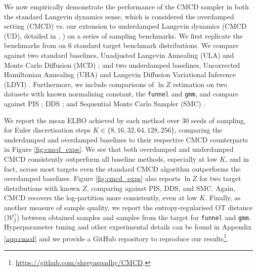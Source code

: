     We now empirically demonstrate the performance of the CMCD sampler in both the standard Langevin dynamics sense, which is considered the overdamped setting (CMCD) vs. our extension to underdamped Langevin dynamics (CMCD (UD), detailed in , ) on a series of sampling benchmarks. We first replicate the benchmarks from \textcite{geffner2023langevin} on 6 standard target benchmark distributions. We compare against two standard baselines, Unadjusted Langevin Annealing (ULA) \parencite{wu2020stochastic, thin2021monte} and Monte Carlo Diffusion (MCD) \parencite{doucet2022annealed}; and two underdamped baselines, Uncorrected Hamiltonian Annealing (UHA) \parencite{geffner2021mcmc, ZhangAIS2021} and Langevin Diffusion Variational Inference (LDVI) \parencite{geffner2023langevin}. Furthermore, we include comparisons of $\ln Z$ estimation on two datasets with known normalising constant, the \texttt{funnel} and \texttt{gmm}, and compare against PIS \parencite{barr2020quantum, vargas2021bayesian, zhang2021path}; DDS \parencite{vargas2023denoising}; and Sequential Monte Carlo Sampler (SMC) \parencite{del2006sequential, zhou2016toward}.

    We report the mean ELBO achieved by each method over 30 seeds of sampling, for Euler discretisation steps $K \in \{8, 16, 32, 64, 128, 256\}$, comparing the underdamped and overdamped baselines to their respective CMCD counterparts in Figure \ref{fig:cmcd_exps}. We see that both overdamped and underdamped CMCD consistently outperform all baseline methods, especially at low $K$,  and in fact, across most targets even the standard CMCD algorithm outperforms the overdamped baselines. Figure \ref{fig:cmcd_exps} also reports $\ln Z$ for two target distributions with known $Z$, comparing against PIS, DDS, and SMC. Again, CMCD recovers the log-partition more consistently, even at low $K$. Finally, as another measure of sample quality, we report the entropy-regularised OT distance ($\mathcal{W}_2^{\gamma}$) between obtained samples and samples from the target for \texttt{funnel} and \texttt{gmm}. Hyperparameter tuning and other experimental details can be found in Appendix \ref{app:cmcd} and we provide a GitHub repository to reproduce our results\footnote{\url{https://github.com/shreyaspadhy/CMCD}.}.

